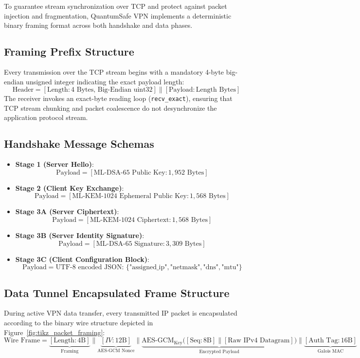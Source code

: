 To guarantee stream synchronization over TCP and protect against packet injection and fragmentation, QuantumSafe VPN implements a deterministic binary framing format across both handshake and data phases.

\subsection{Framing Prefix Structure}
Every transmission over the TCP stream begins with a mandatory 4-byte big-endian unsigned integer indicating the exact payload length:
\begin{equation}
\text{Header} = [\text{Length} : 4\text{ Bytes, Big-Endian uint32}] \parallel [\text{Payload} : \text{Length Bytes}]
\end{equation}
The receiver invokes an exact-byte reading loop (\texttt{recv\_exact}), ensuring that TCP stream chunking and packet coalescence do not desynchronize the application protocol stream.

\subsection{Handshake Message Schemas}
\begin{itemize}
    \item \textbf{Stage 1 (Server Hello)}:
    $$\text{Payload} = [\text{ML-DSA-65 Public Key} : 1,952\text{ Bytes}]$$
    \item \textbf{Stage 2 (Client Key Exchange)}:
    $$\text{Payload} = [\text{ML-KEM-1024 Ephemeral Public Key} : 1,568\text{ Bytes}]$$
    \item \textbf{Stage 3A (Server Ciphertext)}:
    $$\text{Payload} = [\text{ML-KEM-1024 Ciphertext} : 1,568\text{ Bytes}]$$
    \item \textbf{Stage 3B (Server Identity Signature)}:
    $$\text{Payload} = [\text{ML-DSA-65 Signature} : 3,309\text{ Bytes}]$$
    \item \textbf{Stage 3C (Client Configuration Block)}:
    $$\text{Payload} = \text{UTF-8 encoded JSON: } \{\text{"assigned\_ip"}, \text{"netmask"}, \text{"dns"}, \text{"mtu"}\}$$
\end{itemize}

\subsection{Data Tunnel Encapsulated Frame Structure}
During active VPN data transfer, every transmitted IP packet is encapsulated according to the binary wire structure depicted in Figure~\ref{fig:tikz_packet_framing}:
\begin{equation}
\label{eq:wire_framing_equation}
\text{Wire Frame} = \underbrace{[\text{Length} : 4\text{B}]}_{\text{Framing}} \parallel \underbrace{[IV : 12\text{B}]}_{\text{AES-GCM Nonce}} \parallel \underbrace{\text{AES-GCM}_{\text{Key}}\Big([\text{Seq} : 8\text{B}] \parallel [\text{Raw IPv4 Datagram}]\Big)}_{\text{Encrypted Payload}} \parallel \underbrace{[\text{Auth Tag} : 16\text{B}]}_{\text{Galois MAC}}
\end{equation}

